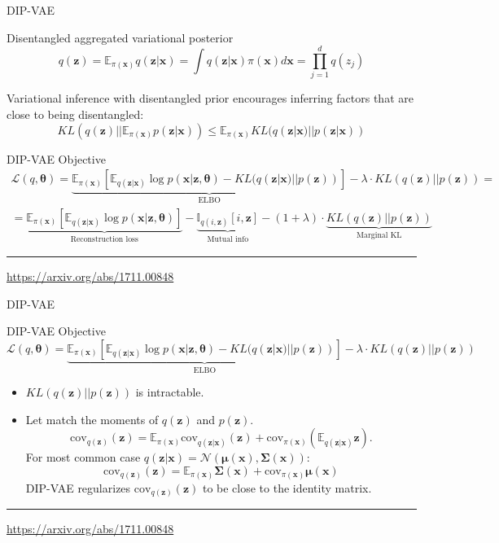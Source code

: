 \documentclass{beamer}
\newcommand{\bx}{\mathbf{x}}
\newcommand{\bz}{\mathbf{z}}
\newcommand{\bmu}{\boldsymbol{\mu}}
\newcommand{\bSigma}{\boldsymbol{\Sigma}}
\newcommand{\bbE}{\mathbb{E}}
\newcommand{\cN}{\mathcal{N}}
\newcommand{\btheta}{\boldsymbol{\theta}}
\begin{document}
\begin{frame}{DIP-VAE}
	\begin{block}{Disentangled aggregated variational posterior}
		\vspace{-0.3cm}
		\[
		q(\bz) = \bbE_{\pi(\bx)} q(\bz | \bx) = \int q(\bz | \bx) \pi(\bx) d\bx = \prod_{j=1}^d q(z_j)
		\]
		\vspace{-0.3cm}
	\end{block}
	Variational inference with disentangled prior encourages inferring factors that are close to being disentangled:
	\[
		KL(q(\bz) || \bbE_{\pi(\bx)} p(\bz | \bx)) \leq \bbE_{\pi(\bx)} KL(q(\bz | \bx) || p(\bz | \bx))	
	\]
	\begin{block}{DIP-VAE Objective}
		\vspace{-0.3cm}
		{\footnotesize
			\begin{multline*}
			\mathcal{L}(q, \btheta) = \underbrace{\bbE_{\pi(\bx)} \left[ \mathbb{E}_{q(\bz | \bx)} \log p(\bx | \bz, \btheta) - KL(q(\bz | \bx) || p(\bz)) \right]}_{\text{ELBO}} -\lambda \cdot KL(q(\bz) || p(\bz)) = \\
			= \underbrace{\bbE_{\pi(\bx)} \left[\mathbb{E}_{q(\bz | \bx)} \log p(\bx | \bz, \btheta)\right]}_{\text{Reconstruction loss}} - \underbrace{\mathbb{I}_{q(i, \bz)} [i, \bz]}_{\text{Mutual info}} - (1 + \lambda) \cdot \underbrace{KL(q(\bz) || p(\bz))}_{\text{Marginal KL}}
			\end{multline*}
		}
		\vspace{-0.3cm}
	\end{block}

	\vfill
	\hrule\medskip
	{\scriptsize \href{https://arxiv.org/abs/1711.00848}{https://arxiv.org/abs/1711.00848}}
\end{frame}
\begin{frame}{DIP-VAE}
	\begin{block}{DIP-VAE Objective}
		\vspace{-0.3cm}
		{\footnotesize
			\[
				\mathcal{L}(q, \btheta) = \underbrace{\bbE_{\pi(\bx)} \left[ \mathbb{E}_{q(\bz | \bx)} \log p(\bx | \bz, \btheta) - KL(q(\bz | \bx) || p(\bz)) \right]}_{\text{ELBO}} -\lambda \cdot KL(q(\bz) || p(\bz))
			\]
		}
		\vspace{-0.3cm}
	\end{block}
	\begin{itemize}
		\item $KL(q(\bz) || p(\bz))$ is intractable.
		\item Let match the moments of $q(\bz)$ and $p(\bz)$.
		\[
		\text{cov}_{q(\bz)}(\bz) = \bbE_{\pi(\bx)} \text{cov}_{q(\bz|\bx)}(\bz) + \text{cov}_{\pi(\bx)} \left( \bbE_{q(\bz | \bx)}\bz \right).
		\]
		For most common case $q(\bz | \bx) = \cN(\bmu(\bx), \bSigma(\bx))$:
		\[
		\text{cov}_{q(\bz)}(\bz) = \bbE_{\pi(\bx)} \bSigma(\bx) + \text{cov}_{\pi(\bx)} \bmu(\bx)
		\]
		DIP-VAE regularizes $\text{cov}_{q(\bz)}(\bz) $ to be close to the identity matrix.
	\end{itemize}
	
	\vfill
	\hrule\medskip
	{\scriptsize \href{https://arxiv.org/abs/1711.00848}{https://arxiv.org/abs/1711.00848}}
\end{frame}
\end{document}
